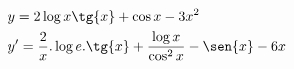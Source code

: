 \begin{ex}
\begin{align}
&y=2\log{x}\tg{x}+\cos{x}-3x^2\nonumber\\
&y'=\frac{2}{x}.\log{e}.\tg{x}+\frac{\log{x}}{\cos^2{x}}-\sen{x}-6x\nonumber
\end{align}
\end{ex}
